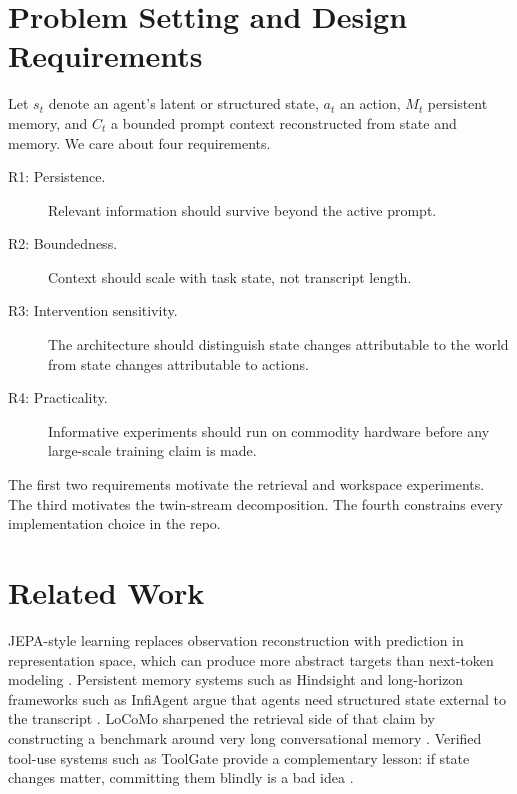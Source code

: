\documentclass[11pt]{article}
\begin{document}
\section{Problem Setting and Design Requirements}
Let $s_t$ denote an agent's latent or structured state, $a_t$ an action, $M_t$ persistent memory, and $C_t$ a bounded prompt context reconstructed from state and memory. We care about four requirements.
\begin{description}
    \item[R1: Persistence.] Relevant information should survive beyond the active prompt.
    \item[R2: Boundedness.] Context should scale with task state, not transcript length.
    \item[R3: Intervention sensitivity.] The architecture should distinguish state changes attributable to the world from state changes attributable to actions.
    \item[R4: Practicality.] Informative experiments should run on commodity hardware before any large-scale training claim is made.
\end{description}

The first two requirements motivate the retrieval and workspace experiments. The third motivates the twin-stream decomposition. The fourth constrains every implementation choice in the repo.

\section{Related Work}
JEPA-style learning replaces observation reconstruction with prediction in representation space, which can produce more abstract targets than next-token modeling \citep{assran2023jepa, chen2025vljepa, assran2025vjepa2}. Persistent memory systems such as Hindsight and long-horizon frameworks such as InfiAgent argue that agents need structured state external to the transcript \citep{latimer2025hindsight, yu2026infiagent}. LoCoMo sharpened the retrieval side of that claim by constructing a benchmark around very long conversational memory \citep{maharana2024locomo}. Verified tool-use systems such as ToolGate provide a complementary lesson: if state changes matter, committing them blindly is a bad idea \citep{liu2026toolgate}.
\end{document}
